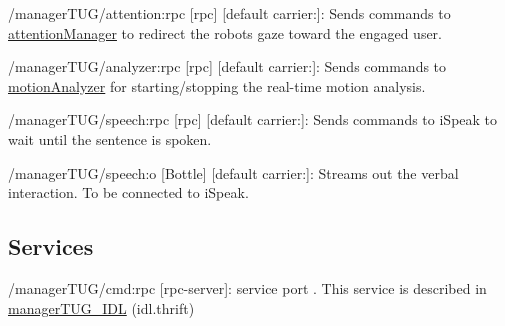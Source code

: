 \begin{DoxyItemize}
\item /manager\+T\+U\+G/attention\+:rpc \mbox{[}rpc\mbox{]} \mbox{[}default carrier\+:\mbox{]}\+: Sends commands to \hyperlink{group__attentionManager}{attention\+Manager} to redirect the robot\textquotesingle{}s gaze toward the engaged user.
\item /manager\+T\+U\+G/analyzer\+:rpc \mbox{[}rpc\mbox{]} \mbox{[}default carrier\+:\mbox{]}\+: Sends commands to \hyperlink{group__motionAnalyzer}{motion\+Analyzer} for starting/stopping the real-\/time motion analysis.
\item /manager\+T\+U\+G/speech\+:rpc \mbox{[}rpc\mbox{]} \mbox{[}default carrier\+:\mbox{]}\+: Sends commands to i\+Speak to wait until the sentence is spoken.
\item /manager\+T\+U\+G/speech\+:o \mbox{[}Bottle\mbox{]} \mbox{[}default carrier\+:\mbox{]}\+: Streams out the verbal interaction. To be connected to i\+Speak.
\end{DoxyItemize}\hypertarget{group__skeletonViewer_services_sec}{}\subsection{Services}\label{group__skeletonViewer_services_sec}

\begin{DoxyItemize}
\item /manager\+T\+U\+G/cmd\+:rpc \mbox{[}rpc-\/server\mbox{]}\+: service port . This service is described in \hyperlink{classmanagerTUG__IDL}{manager\+T\+U\+G\+\_\+\+I\+DL} (idl.\+thrift) 
\end{DoxyItemize}